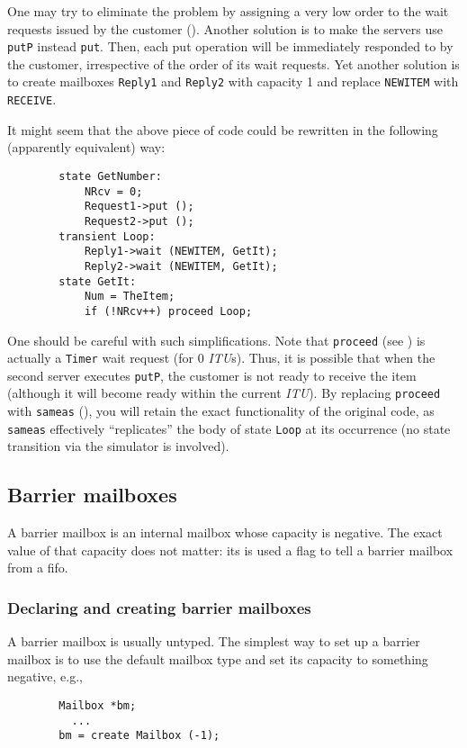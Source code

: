 One may try to eliminate the problem by assigning a very low order to
the wait requests issued by the customer ().
Another solution
is to make the servers use {\tt putP} instead {\tt put}.
Then, each put operation will be immediately responded to by the customer,
irrespective of the order of its wait requests.
Yet another solution is to create mailboxes {\tt Reply1} and {\tt Reply2}
with capacity 1 and replace {\tt NEWITEM} with {\tt RECEIVE}.

It might seem that the above piece of code could be rewritten in
the following (apparently equivalent) way:
\begin{verbatim}
        state GetNumber:
            NRcv = 0;
            Request1->put ();
            Request2->put ();
        transient Loop:
            Reply1->wait (NEWITEM, GetIt);
            Reply2->wait (NEWITEM, GetIt);
        state GetIt:
            Num = TheItem;
            if (!NRcv++) proceed Loop;
\end{verbatim}
One should be careful with such simplifications.
Note that {\tt proceed} (see ) is
actually a {\tt Timer} wait request (for 0 {\em ITU\/}s).
Thus, it is possible that when the second server executes {\tt putP},
the customer is not ready to receive the item (although it will become
ready within the current {\em ITU\/}).
By replacing {\tt proceed} with {\tt sameas} (), you will
retain the exact functionality of the original code, as
{\tt sameas} effectively ``replicates'' the body of state {\tt Loop} at
its occurrence (no state transition via the simulator is involved).

\subsection{Barrier mailboxes}
\label{rm_mb_ba}

A barrier mailbox is an internal mailbox whose capacity is negative.
The exact value of that capacity does not matter: its is used a flag to tell
a barrier mailbox from a fifo.

\subsubsection{Declaring and creating barrier mailboxes}
\label{rm_mb_ba_dc}

A barrier mailbox is usually untyped.
The simplest way to set up a barrier mailbox is to use the default mailbox
type and set its capacity to something negative, e.g.,
\begin{verbatim}
        Mailbox *bm;
          ...
        bm = create Mailbox (-1);
\end{verbatim}

